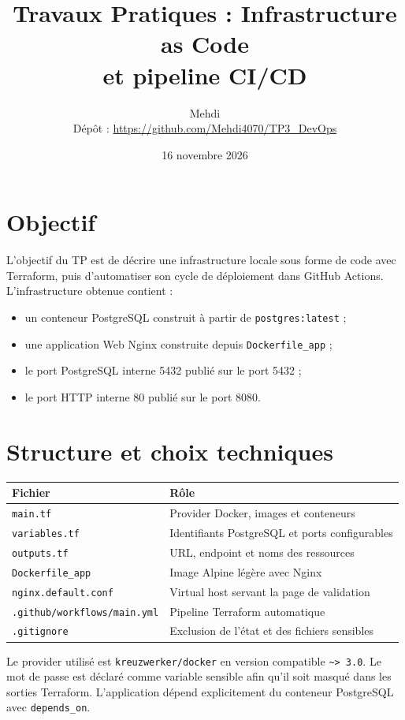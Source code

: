 \documentclass[11pt,a4paper]{article}
\title{Travaux Pratiques : Infrastructure as Code\\et pipeline CI/CD}
\author{Mehdi\\Dépôt : \url{https://github.com/Mehdi4070/TP3_DevOps}}
\date{16 novembre 2026}
\begin{document}
\maketitle
\tableofcontents
\newpage

\section{Objectif}

L'objectif du TP est de décrire une infrastructure locale sous forme de code avec
Terraform, puis d'automatiser son cycle de déploiement dans GitHub Actions.
L'infrastructure obtenue contient :

\begin{itemize}[noitemsep]
  \item un conteneur PostgreSQL construit à partir de \texttt{postgres:latest} ;
  \item une application Web Nginx construite depuis \texttt{Dockerfile\_app} ;
  \item le port PostgreSQL interne 5432 publié sur le port 5432 ;
  \item le port HTTP interne 80 publié sur le port 8080.
\end{itemize}

\section{Structure et choix techniques}

\begin{tabular}{@{}ll@{}}
\toprule
Fichier & Rôle \\
\midrule
\texttt{main.tf} & Provider Docker, images et conteneurs \\
\texttt{variables.tf} & Identifiants PostgreSQL et ports configurables \\
\texttt{outputs.tf} & URL, endpoint et noms des ressources \\
\texttt{Dockerfile\_app} & Image Alpine légère avec Nginx \\
\texttt{nginx.default.conf} & Virtual host servant la page de validation \\
\texttt{.github/workflows/main.yml} & Pipeline Terraform automatique \\
\texttt{.gitignore} & Exclusion de l'état et des fichiers sensibles \\
\bottomrule
\end{tabular}

Le provider utilisé est \texttt{kreuzwerker/docker} en version compatible
\texttt{\textasciitilde> 3.0}. Le mot de passe est déclaré comme variable sensible afin
qu'il soit masqué dans les sorties Terraform. L'application dépend explicitement du
conteneur PostgreSQL avec \texttt{depends\_on}.
\end{document}
